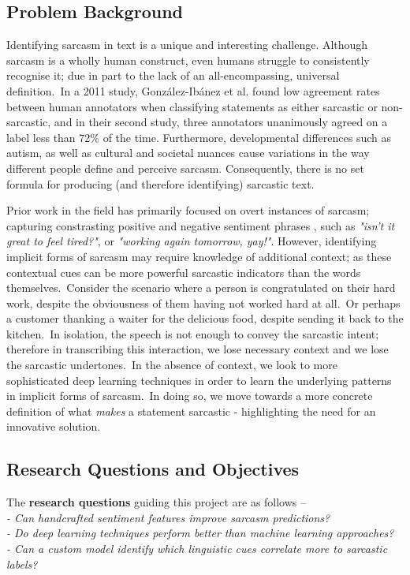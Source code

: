 \documentclass[12pt,a4paper]{article}
\begin{document}
\subsection{Problem Background}\vspace{-4.2pt}
\noindent Identifying sarcasm in text is a unique and interesting challenge. Although sarcasm is a wholly human construct, even humans struggle to consistently recognise it; due in part to the lack of an all-encompassing, universal definition.\ In a 2011 study, Gonz{\'a}lez-Ib{\'a}nez et al. \cite{gonzalez2011identifying} found low agreement rates between human annotators when classifying statements as either sarcastic or non-sarcastic, and in their second study, three annotators unanimously agreed on a label less than 72\% of the time. Furthermore, developmental differences such as autism, as well as cultural and societal nuances cause variations in the way different people define and perceive sarcasm. Consequently, there is no set formula for producing (and therefore identifying) sarcastic text.

Prior work in the field has primarily focused on overt instances of sarcasm; capturing constrasting positive and negative sentiment phrases \cite{riloff2013sarcasm}, such as \textit{"isn't it great to feel tired?"}, or \textit{"working again tomorrow, yay!"}. However, identifying implicit forms of sarcasm may require knowledge of additional context; as these contextual cues can be more powerful sarcastic indicators than the words themselves.\ Consider the scenario where a person is congratulated on their hard work, despite the obviousness of them having not worked hard at all.\ Or perhaps a customer thanking a waiter for the delicious food, despite sending it back to the kitchen.\ In isolation, the speech is not enough to convey the sarcastic intent; therefore in transcribing this interaction, we lose necessary context and we lose the sarcastic undertones.\ In the absence of context, we look to more sophisticated deep learning techniques in order to learn the underlying patterns in implicit forms of sarcasm.\ In doing so, we move towards a more concrete definition of what \textit{makes} a statement sarcastic - highlighting the need for an innovative solution.

\subsection{Research Questions and Objectives}
\vspace{-4.2pt}
\noindent The \textbf{research questions} guiding this project are as follows --\\
\indent \textit{- Can handcrafted sentiment features improve sarcasm predictions?}\\ 
\indent \textit{- Do deep learning techniques perform better than machine learning approaches?}\\ 
\indent \textit{- Can a custom model identify which linguistic cues correlate more to sarcastic labels?}\\
\end{document}
